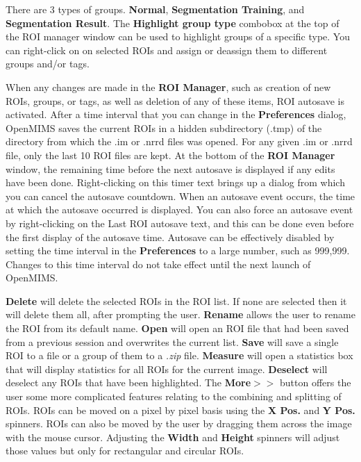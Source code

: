 \documentclass{article}
\begin{document}
  	There are 3 types of groups.  \textbf{Normal}, \textbf{Segmentation Training}, and \textbf{Segmentation Result}.   
	The  \textbf{Highlight group type}  combobox at the top of the ROI manager window can be used to highlight groups of a specific type. 
	 You can right-click on on selected ROIs and assign or deassign them to different groups and/or tags.
	
	When any changes are made in the \textbf{ROI Manager}, such as creation of new ROIs, groups, or tags, as well as deletion of any 
	of these items, ROI autosave is activated.    After a time interval that you can change in the \textbf{Preferences} dialog, OpenMIMS 
	saves the current ROIs in a hidden subdirectory (.tmp) of the directory from which the .im or .nrrd files was opened.   For any given
	 .im or .nrrd file, only the last 10 ROI files are kept.  At the bottom of the \textbf{ROI Manager} window, the remaining time before the 
	 next autosave is displayed if any edits have been done.   Right-clicking on this timer text brings up a dialog from which you can 
	 cancel the autosave countdown.     When an autosave event occurs, the time at which the autosave occurred is displayed.  You 
	 can also force an autosave event by right-clicking on the  Last ROI autosave text, and this can be done even before the first display 
	 of the autosave time.   Autosave can be effectively disabled by setting the time interval in the \textbf{Preferences}  to a large number, 
	 such as 999,999.   Changes to this time interval do not take effect until the next launch of OpenMIMS.

	\textbf{Delete} will delete the selected ROIs in the ROI list.
	If none are selected then it will delete them all, after prompting the user. \textbf{Rename}
	allows the user to rename the ROI from its default name.
	\textbf{Open} will open an ROI file that had been saved from a previous session and overwrites the current list.
	\textbf{Save} will save a single ROI to a file or a group of them to a \textit{.zip} file.
	\textbf{Measure} will open a statistics box that will display statistics for all ROIs for
	the current image. \textbf{Deselect} will deselect any ROIs that have been highlighted. The
	\textbf{More$>>$} button offers the user some more complicated features relating to the 
	combining and splitting of ROIs. ROIs can be moved on a pixel by pixel basis using the 
	\textbf{X Pos.} and \textbf{Y Pos.} spinners. ROIs can also be moved by the user by 
	dragging them across the image with the mouse cursor. Adjusting the \textbf{Width} and
	\textbf{Height} spinners will adjust those values but only for rectangular and circular ROIs.
\end{document}
